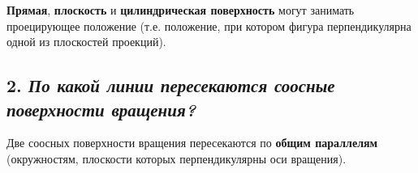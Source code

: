 \textbf{Прямая}, \textbf{плоскость} и \textbf{цилиндрическая поверхность} могут занимать проецирующее положение (т.е. положение, при котором фигура перпендикулярна одной из плоскостей проекций).

\vspace*{28pt}
\subsection*{2. \textit{По какой линии пересекаются соосные поверхности вращения?}}
\begin{mainQuote}
\end{mainQuote}

Две соосных поверхности вращения пересекаются по \textbf{общим параллелям} (окружностям, плоскости которых перпендикулярны оси вращения).




\newpage
\let\clearpage\relax
